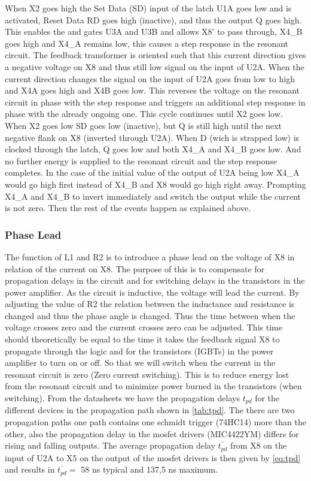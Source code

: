 When X2 goes high the Set Data (SD) input of the latch U1A goes low and is activated, Reset Data RD goes high (inactive), and thus the output Q goes high. This enables the and gates U3A and U3B and allows X8' to pass through, X4\_B goes high and X4\_A remains low, this causes a step response in the resonant circuit. The feedback transformer is oriented such that this current direction gives a negative voltage on X8 and thus still low signal on the input of U2A. When the current direction changes the signal on the input of U2A goes from low to high and X4A goes high and X4B goes low. This reverses the voltage on the resonant circuit in phase with the step response and triggers an additional step response in phase with the already ongoing one. This cycle continues until X2 goes low. When X2 goes low SD goes low (inactive), but Q is still high until the next negative flank on X8 (inverted through U2A). When D (wich is strapped low) is clocked through the latch, Q goes low and both X4\_A and X4\_B goes low. And no further energy is supplied to the resonant circuit and the step response completes. In the case of the initial value of the output of U2A being low X4\_A would go high first instead of X4\_B and X8 would go high right away. Prompting X4\_A and X4\_B to invert immediately and switch the output while the current is not zero. Then the rest of the events happen as explained above. 

\subsubsection{Phase Lead}
\label{sec:phaselead}
The function of L1 and R2 is to introduce a phase lead on the voltage of X8 in relation of the current on X8. The purpose of this is to compensate for propagation delays in the circuit and for switching delays in the transistors in the power amplifier. As the circuit is inductive, the voltage will lead the current. By adjusting the value of R2 the relation between the inductance and resistance is changed and thus the phase angle is changed. Thus the time between when the voltage crosses zero and the current crosses zero can be adjusted. This time should theoretically be equal to the time it takes the feedback signal X8 to propagate through the logic and for the transistors (IGBTs) in the power amplifier to turn on or off. So that we will switch when the current in the resonant circuit is zero (Zero current switching). This is to reduce energy lost from the resonant circuit and to minimize power burned in the transistors (when switching). From the datasheets we have the propagation delays $t_{pd}$ for the different devices in the propagation path shown in \cref{tab:tpd}. The there are two propagation paths one path contains one schmidt trigger (74HC14) more than the other, also the propagation delay in the mosfet drivers (MIC4422YM) differs for rising and falling outputs. The average propagation delay $\overline{t_{pd}}$ from X8 on the input of U2A to X5 on the output of the mosfet drivers is then given by \cref{eq:tpd} and results in $\overline{t_{pd}} =$ 58 ns typical and 137,5 ns maximum.

